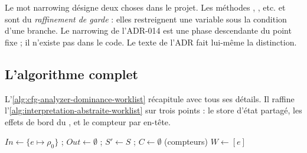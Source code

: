 \begin{piege}
  Le mot \og narrowing\fg{} désigne deux choses dans le projet. Les méthodes
  , , etc. et 
  sont du \emph{raffinement de garde} : elles restreignent une variable sous
  la condition d'une branche. Le narrowing de l'ADR-014 est une phase
  descendante du point fixe ; il n'existe pas dans le code. Le texte de
  l'ADR fait lui-même la distinction.
\end{piege}

\subsection{L'algorithme complet}

L'\cref{alg:cfg-analyzer-dominance-worklist} récapitule 
avec tous ses détails. Il raffine
l'\cref{alg:interpretation-abstraite-worklist} sur trois points : le store
d'état partagé, les effets de bord du , et le compteur par
en-tête.

\begin{algorithm}[htbp]
$\mathit{In} \gets \{e \mapsto \rho_0\}$ ; $\mathit{Out} \gets \emptyset$ ; $S' \gets S$ ; $C \gets \emptyset$ (compteurs)\;
$W \gets [e]$\;
\caption{ ()}
\label{alg:cfg-analyzer-dominance-worklist}
\end{algorithm}

